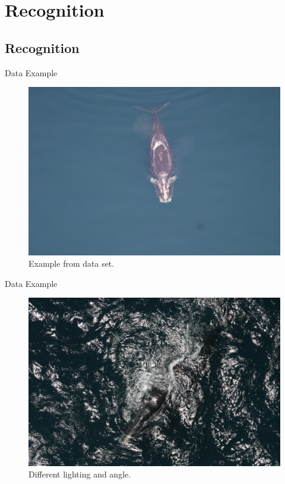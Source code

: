 \documentclass{beamer}
\begin{document}
\section{Recognition}
\subsection{Recognition}
\begin{frame}{Data Example}
\begin{figure}
\includegraphics[scale=.08]{example.png}
\caption{Example from data set.}
\end{figure}
\end{frame}

\begin{frame}{Data Example}
\begin{figure}
\includegraphics[scale=.08]{example2.png}
\caption{Different lighting and angle.}
\end{figure}
\end{frame}
\end{document}
